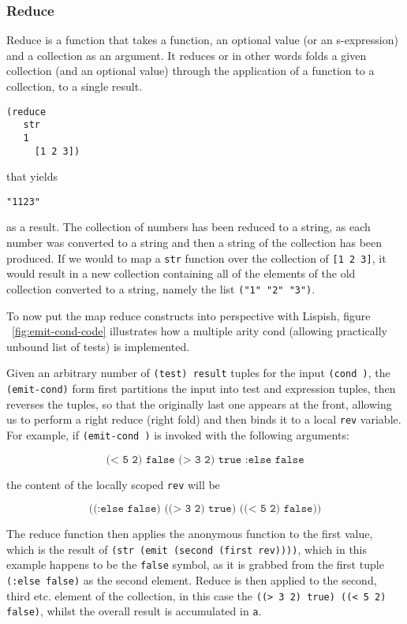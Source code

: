 \subsubsection{Reduce}
Reduce is a function that takes a function, an optional value (or an s-expression) and a collection as an argument. It reduces or in other words folds a given collection (and an optional value) through the application of a function to a collection, to a single result. 
\begin{verbatim}
(reduce 
   str
   1
	 [1 2 3])
\end{verbatim}
that yields 
\begin{verbatim}
"1123"
\end{verbatim}
as a result. The collection of numbers has been reduced to a string, as each number was converted to a string and then a string of the collection has been produced.
If we would to map a \texttt{str} function over the collection of \texttt{[1 2 3]}, it would result in a new collection containing all of the elements of the old collection converted to a string, namely the list \texttt{("1" "2" "3")}.

To now put the map reduce constructs into perspective with Lispish, figure ~\ref{fig:emit-cond-code} illustrates how a multiple arity cond (allowing practically unbound list of tests) is implemented.



Given an arbitrary number of \texttt{(test) result} tuples for the input 
\texttt{(cond )}, the \texttt{(emit-cond)} form first partitions the input into test and expression tuples, then reverses the tuples, so that the originally last one appears at the front, allowing us to perform a right reduce (right fold) and then binds it to a local \texttt{rev} variable. 
For example, if \texttt{(emit-cond )} is invoked with the following arguments:

$$ \texttt{(< 5 2) false (> 3 2) true :else false} $$

the content of the locally scoped \texttt{rev} will be 

$$ \texttt{((:else false) ((> 3 2) true) ((< 5 2) false))} $$

The reduce function then applies the anonymous function to the first value, which is the result of \texttt{(str (emit (second (first rev))))}, which in this example happens to be the \texttt{false} symbol, as it is grabbed from the first tuple \texttt{(:else false)} as the second element. Reduce is then applied to the second, third etc. element of the collection, in this case the \texttt{((> 3 2) true) ((< 5 2) false)}, whilst the overall result is accumulated in \texttt{a}.

